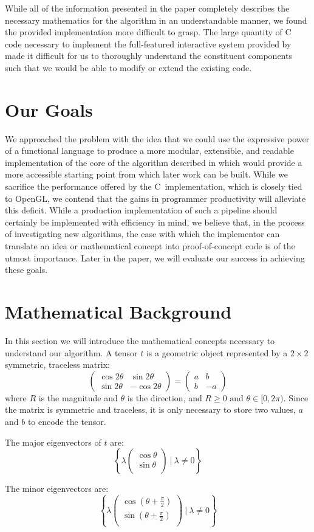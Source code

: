 \documentclass[twocolumn]{article}
\newcommand{\sqmat}[4]{\ensuremath{
    \left(\begin{array}{cc}
        #1 & #2 \\
        #3 & #4
    \end{array}\right)}}
\newcommand{\mkvec}[2]{\ensuremath{
    \left(\begin{array}{c}
        #1 \\
        #2 \\
    \end{array}\right)}}
\def \cpp {C\nolinebreak[4]\hspace{-.05em}\raisebox{.4ex}{\tiny\bf ++}~}
\begin{document}
While all of the information presented in the paper completely describes the
necessary mathematics for the algorithm in an understandable manner, we found
the provided implementation more difficult to grasp. The large quantity of \cpp
code necessary to implement the full-featured interactive system provided by
\cite{chen} made it difficult for us to thoroughly understand the constituent
components such that we would be able to modify or extend the existing code.

\section{Our Goals}
We approached the problem with the idea that we could use the expressive power
of a functional language to produce a more modular, extensible, and readable
implementation of the core of the algorithm described in \cite{chen} which
would provide a more accessible starting point from which later work can be
built.  While we sacrifice the performance offered by the \cpp implementation,
which is closely tied to OpenGL, we contend that the gains in programmer
productivity will alleviate this deficit. While a production implementation of
such a pipeline should certainly be implemented with efficiency in mind, we
believe that, in the process of investigating new algorithms, the ease with
which the implementor can translate an idea or mathematical concept into
proof-of-concept code is of the utmost importance.  Later in the paper, we will
evaluate our success in achieving these goals.

\section{Mathematical Background}\label{sec:math}
In this section we will introduce the mathematical concepts necessary to
understand our algorithm. A tensor $t$ is a geometric object represented by a
$2\times2$ symmetric, traceless matrix:
\[
    \sqmat{\cos{2\theta}}{\sin{2\theta}}{\sin{2\theta}}{-\cos{2\theta}}
    = \sqmat{a}{b}{b}{-a}
\]
where $R$ is the magnitude and $\theta$ is the direction, and
$R\geq0 \textrm{ and } \theta\in[0,2\pi)$. Since the matrix is symmetric and
traceless, it is only necessary to store two values, $a$ and $b$ to encode
the tensor.

The major eigenvectors of $t$ are:
\[
    \left\{
        \lambda\mkvec{\cos{\theta}}{\sin{\theta}} ~|~ \lambda \neq 0
    \right\}
\]

The minor eigenvectors are:
\[
    \left\{
        \lambda\mkvec
                {\cos{(\theta+\frac{\pi}{2})}}
                {\sin{(\theta+\frac{\pi}{2})}}
        ~|~ \lambda \neq 0
    \right\}
\]
\end{document}
